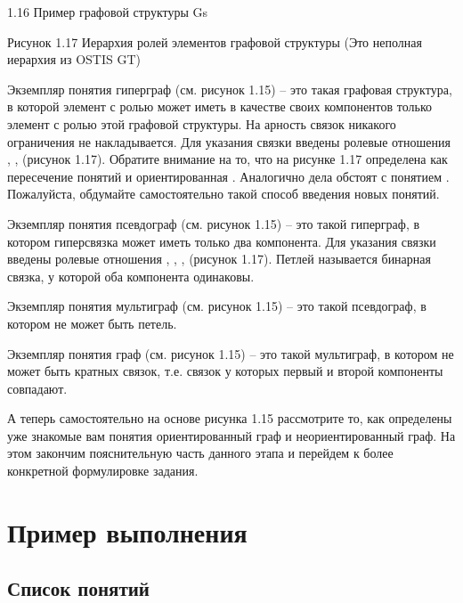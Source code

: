 1.16 Пример графовой структуры Gs
 
Рисунок 1.17 Иерархия ролей элементов графовой структуры (Это неполная иерархия из OSTIS GT)

Экземпляр понятия гиперграф (см. рисунок 1.15) – это такая графовая
структура, в которой элемент с ролью  может иметь в
качестве своих компонентов только элемент с ролью  этой
графовой структуры.  На арность связок никакого ограничения не
накладывается. Для указания связки введены ролевые отношения
, ,  (рисунок
1.17). Обратите внимание на то, что на рисунке 1.17 
определена как пересечение понятий  и
ориентированная . Аналогично дела обстоят с понятием
. Пожалуйста, обдумайте самостоятельно такой способ
введения новых понятий.

Экземпляр понятия псевдограф (см. рисунок 1.15) – это такой гиперграф,
в котором гиперсвязка может иметь только два компонента.  Для указания
связки введены ролевые отношения , ,
,  (рисунок 1.17). Петлей называется бинарная
связка, у которой оба компонента одинаковы.

Экземпляр понятия мультиграф (см. рисунок 1.15) – это такой
псевдограф, в котором не может быть петель.
 
Экземпляр понятия граф (см. рисунок 1.15) – это такой мультиграф, в
котором не может быть кратных связок, т.е. связок у которых первый и
второй компоненты совпадают.

А теперь самостоятельно на основе рисунка 1.15 рассмотрите то, как
определены уже знакомые вам понятия ориентированный граф и
неориентированный граф. На этом закончим пояснительную часть данного
этапа и перейдем к более конкретной формулировке задания.

\section{Пример выполнения}

\subsection{Список понятий}

